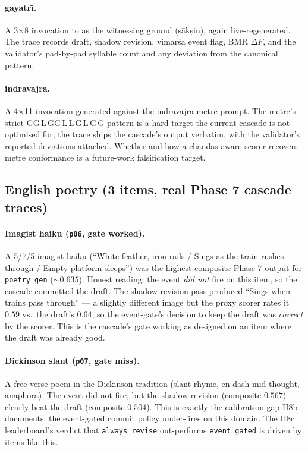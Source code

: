 \paragraph{g\=ayatr\={\i}.} A 3$\times$8 invocation to  as the witnessing ground (s\=ak\d{s}in), again live-regenerated. The trace records draft, shadow revision, vimar\'sa event flag, BMR \(\Delta F\), and the validator's pad-by-pad syllable count and any deviation from the canonical pattern.

\paragraph{indravajr\=a.} A 4$\times$11 invocation generated against the indravajr\=a metre prompt. The metre's strict GG\,L\,GG\,L\,L\,G\,L\,G\,G pattern is a hard target the current cascade is not optimised for; the trace ships the cascade's output verbatim, with the validator's reported deviations attached. Whether and how a chandas-aware scorer recovers metre conformance is a future-work falsification target.

\subsection{English poetry (3 items, real Phase 7 cascade traces)}

\paragraph{Imagist haiku (\texttt{p06}, gate worked).} A 5/7/5 imagist haiku (``White feather, iron rails / Sings as the train rushes through / Empty platform sleeps'') was the highest-composite Phase 7 output for \texttt{poetry\_gen} ($\sim\!0.635$). Honest reading: the  event \emph{did not} fire on this item, so the cascade committed the draft. The shadow-revision pass produced ``Sings when trains pass through'' --- a slightly different image but the proxy scorer rates it $0.59$ vs.\ the draft's $0.64$, so the event-gate's decision to keep the draft was \emph{correct} by the scorer. This is the cascade's gate working as designed on an item where the draft was already good.

\paragraph{Dickinson slant (\texttt{p07}, gate miss).} A free-verse poem in the Dickinson tradition (slant rhyme, en-dash mid-thought, anaphora). The  event did not fire, but the shadow revision (composite $0.567$) clearly beat the draft (composite $0.504$). This is exactly the calibration gap H8b documents: the event-gated commit policy under-fires on this domain. The H8c leaderboard's verdict that \texttt{always\_revise} out-performs \texttt{event\_gated} is driven by items like this.

